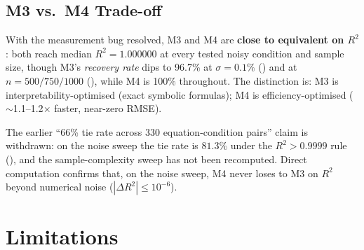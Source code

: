 \documentclass[twoside,11pt]{article}
\newcommand{\Rsq}{R^{2}}
\begin{document}
\subsection{M3 vs.\ M4 Trade-off}

With the measurement bug resolved, M3 and M4 are \textbf{close to
equivalent on $\Rsq$}: both reach median $\Rsq = 1.000000$ at every
tested noisy condition and sample size, though M3's \emph{recovery
rate} dips to 96.7\% at $\sigma=0.1\%$ () and at
$n=500/750/1000$ (), while M4 is 100\% throughout.
The distinction is: M3 is interpretability-optimised (exact symbolic
formulas); M4 is efficiency-optimised ($\sim$1.1--1.2$\times$ faster,
near-zero RMSE).

The earlier ``66\% tie rate across 330 equation-condition pairs'' claim is
withdrawn: on the noise sweep the tie rate is $81.3\%$ under the
$\Rsq>0.9999$ rule (), and the sample-complexity sweep has not
been recomputed. Direct computation confirms that, on the noise sweep, M4 never
loses to M3 on $\Rsq$ beyond numerical noise ($|\Delta\Rsq|\le10^{-6}$).

\section{Limitations}
\label{suppb:limitations}
\end{document}
